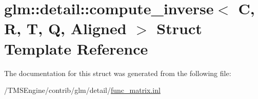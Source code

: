 \hypertarget{structglm_1_1detail_1_1compute__inverse}{}\section{glm\+:\+:detail\+:\+:compute\+\_\+inverse$<$ C, R, T, Q, Aligned $>$ Struct Template Reference}
\label{structglm_1_1detail_1_1compute__inverse}


The documentation for this struct was generated from the following file\+:\begin{DoxyCompactItemize}
\item 
/\+T\+M\+S\+Engine/contrib/glm/detail/\hyperlink{func__matrix_8inl}{func\+\_\+matrix.\+inl}\end{DoxyCompactItemize}
